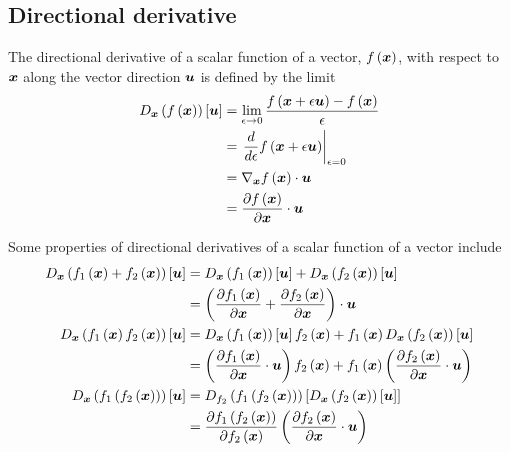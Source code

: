  
\subsection{Directional derivative}
\label{subsec:DirectionalDerivativeOperator}

The directional derivative of a scalar function of a vector,
$ f\left( \boldsymbol{x} \right) $, with respect to $\boldsymbol{x}$ along the vector direction
$\boldsymbol{u}$ is defined by the limit
\begin{equation}
  \begin{split}
    \directionalderiv{\vectr{x}}{\fnof{f}{\vectr{x}}}{\vectr{u}}&=\genlimit{\epsilon}{0}\dfrac{\fnof{f}{\vectr{x}+\epsilon\vectr{u}}-\fnof{f}{\vectr{x}}}{\epsilon}
    \\ &=
    \evalat{\dfrac{d}{d\epsilon}\fnof{f}{\vectr{x}+\epsilon\vectr{u}}}{\epsilon=0}\\ &=
    \dotprod{\gradient{\vectr{x}}{\fnof{f}{\vectr{x}}}}{\vectr{u}} \\ &=
    \dotprod{\delby{\fnof{f}{\vectr{x}}}{\vectr{x}}}{\vectr{u}}
  \end{split} 
\end{equation} 
 
Some properties of directional derivatives of a scalar function of a vector include
\begin{equation}
  \begin{split}
    \directionalderiv{\vectr{x}}{\fnof{f_{1}}{\vectr{x}}+\fnof{f_{2}}{\vectr{x}}}{\vectr{u}}&=\directionalderiv{\vectr{x}}{\fnof{f_{1}}{\vectr{x}}}{\vectr{u}}+\directionalderiv{\vectr{x}}{\fnof{f_{2}}{\vectr{x}}}{\vectr{u}}\\
    &=\dotprod{\pbrac{\delby{\fnof{f_{1}}{\vectr{x}}}{\vectr{x}}+\delby{\fnof{f_{2}}{\vectr{x}}}{\vectr{x}}}}{\vectr{u}}\\
    \directionalderiv{\vectr{x}}{\fnof{f_{1}}{\vectr{x}}\fnof{f_{2}}{\vectr{x}}}{\vectr{u}}&=\directionalderiv{\vectr{x}}{\fnof{f_{1}}{\vectr{x}}}{\vectr{u}}\fnof{f_{2}}{\vectr{x}}+\fnof{f_{1}}{\vectr{x}}\directionalderiv{\vectr{x}}{\fnof{f_{2}}{\vectr{x}}}{\vectr{u}}\\
    &=\pbrac{\dotprod{\delby{\fnof{f_{1}}{\vectr{x}}}{\vectr{x}}}{\vectr{u}}}\fnof{f_{2}}{\vectr{x}}+\fnof{f_{1}}{\vectr{x}}\pbrac{\dotprod{\delby{\fnof{f_{2}}{\vectr{x}}}{\vectr{x}}}{\vectr{u}}}\\
    \directionalderiv{\vectr{x}}{\fnof{f_{1}}{\fnof{f_{2}}{\vectr{x}}}}{\vectr{u}}&=\directionalderiv{f_{2}}{\fnof{f_{1}}{\fnof{f_{2}}{\vectr{x}}}}{\directionalderiv{\vectr{x}}{\fnof{f_{2}}{\vectr{x}}}{\vectr{u}}}\\
    &=\delby{\fnof{f_{1}}{\fnof{f_{2}}{\vectr{x}}}}{\fnof{f_{2}}{\vectr{x}}}\pbrac{\dotprod{\delby{\fnof{f_{2}}{\vectr{x}}}{\vectr{x}}}{\vectr{u}}}
  \end{split}
\end{equation}

